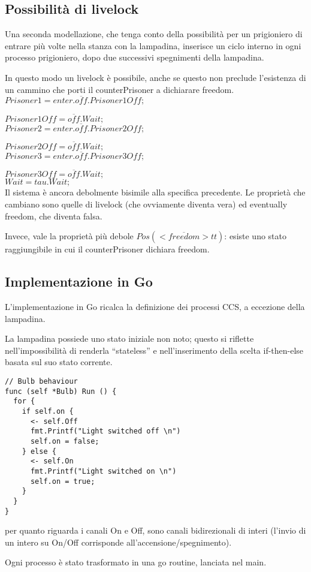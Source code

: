 \subsection{Possibilità di livelock}

Una seconda modellazione, che tenga conto della possibilità per un prigioniero di entrare
più volte nella stanza con la lampadina, inserisce un ciclo interno in ogni processo
prigioniero, dopo due successivi spegnimenti della lampadina.

In questo modo un livelock è possibile, anche se questo non preclude l'esistenza di un
cammino che porti il counterPrisoner a dichiarare freedom. \\

$Prisoner1 = enter.\overline{off}.Prisoner1Off;$

$Prisoner1Off = \overline{off}.Wait;$ \\

$Prisoner2 = enter.\overline{off}.Prisoner2Off;$

$Prisoner2Off = \overline{off}.Wait;$ \\

$Prisoner3 = enter.\overline{off}.Prisoner3Off;$

$Prisoner3Off = \overline{off}.Wait;$ \\

$Wait = tau.Wait;$ \\

Il sistema è ancora debolmente bisimile alla specifica precedente. Le proprietà che cambiano
sono quelle di livelock (che ovviamente diventa vera) ed eventually freedom, che diventa
falsa.

Invece, vale la proprietà più debole $Pos(<\overline{freedom}>tt)$: esiste uno stato raggiungibile
in cui il counterPrisoner dichiara freedom.

\subsection{Implementazione in Go}

L'implementazione in Go ricalca la definizione dei processi CCS, a eccezione
della lampadina.

La lampadina possiede uno stato iniziale non noto; questo si riflette
nell'impossibilità di renderla ``stateless'' e nell'inserimento della scelta
if-then-else basata sul suo stato corrente.

\begin{verbatim}
// Bulb behaviour
func (self *Bulb) Run () {
  for {
    if self.on {
      <- self.Off
      fmt.Printf("Light switched off \n")
      self.on = false;
    } else {
      <- self.On
      fmt.Printf("Light switched on \n")
      self.on = true;
    }
  }
}
\end{verbatim}

per quanto riguarda i canali On e Off, sono canali bidirezionali di interi
(l'invio di un intero su On/Off corrisponde all'accensione/spegnimento).

Ogni processo è stato trasformato in una go routine, lanciata nel main.


